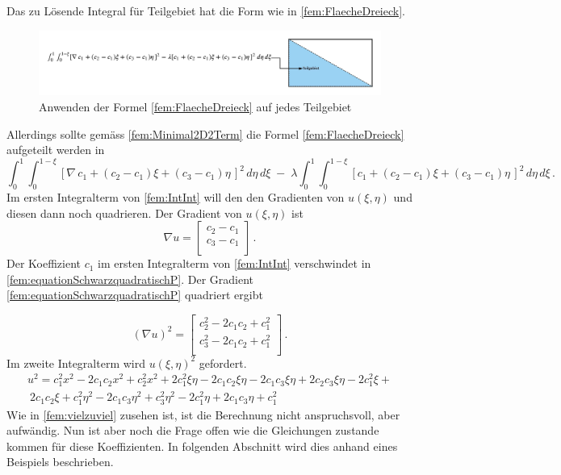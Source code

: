 Das zu Lösende Integral für Teilgebiet hat die Form wie in \eqref{fem:FlaecheDreieck}. 
\begin{figure}[h!]
	\centering
	\includegraphics[scale=0.6]{papers/fem/Images/FoTeilgebiet.jpeg}
	\caption{Anwenden der Formel \eqref{fem:FlaecheDreieck} auf jedes Teilgebiet}
	\label{fig:schemNMR_vorlage}
\end{figure}
Allerdings sollte gemäss \eqref{fem:Minimal2D2Term} die Formel \eqref{fem:FlaecheDreieck} aufgeteilt werden in
\begin{equation}
\int_0^1 \int_0^{1 - \xi} [\nabla \, c_1 + (c_2 - c_1)\xi + (c_3 - c_1)\eta \, ]^2 \, d \eta \, d \xi \; - \; \lambda \int_0^1 \int_0^{1 - \xi} [c_1 + (c_2 - c_1)\xi + (c_3 - c_1)\eta \, ]^2 \, d \eta  \, d \xi \, .
\label{fem:IntInt}
\end{equation}
Im ersten Integralterm von \eqref{fem:IntInt} will den den Gradienten von $u(\xi, \eta)$ und diesen dann noch quadrieren. Der Gradient von $u(\xi, \eta)$ ist 
\begin{equation}
	\nabla u = 	
	\left[ \begin{array}{r}
	c_2 - c_1 \\
	c_3 - c_1 \\
	\end{array}\right] \, .
	\label{fem:equationSchwarzquadratischP}
\end{equation} 
Der Koeffizient $c_1$ im ersten Integralterm von \eqref{fem:IntInt} verschwindet in \eqref{fem:equationSchwarzquadratischP}. Der Gradient \ref{fem:equationSchwarzquadratischP} quadriert ergibt

\begin{equation}
	(\nabla u)^2 = 	
	\left[ \begin{array}{r}
	c_2^2 - 2 c_1 c_2 + c_1^2 \\
	c_3^2 -2 c_1 c_2 + c_1^2 \\
	\end{array}\right] \, .
	\label{fem:equationSchwarzquadratischQ2}
\end{equation}
Im zweite Integralterm wird $u(\xi, \eta)^2$ gefordert. 
\begin{multline}
	u^2 = c_1^2 x^2  - 2 c_1 c_2 x^2 + c_2^2 x^2 + 2 c_1^2 \xi \eta - 2 c_1 c_2 \xi \eta - 2 c_1 c_3 \xi \eta + 2 c_2 c_3 \xi \eta - 2 c_1^2 \xi + \\\ 2 c_1 c_2 \xi + c_1^2 \eta^2 - 2 c_1 c_3 \eta^2 + c_3^2 \eta^2 - 2 c_1^2 \eta + 2 c_1 c_3 \eta + c_1^2
	\label{fem:vielzuviel}
\end{multline}
Wie in \eqref{fem:vielzuviel} zusehen ist, ist die Berechnung nicht anspruchsvoll, aber aufwändig. Nun ist aber noch die Frage offen wie die Gleichungen zustande kommen für diese Koeffizienten. In folgenden Abschnitt wird dies anhand eines Beispiels beschrieben.

